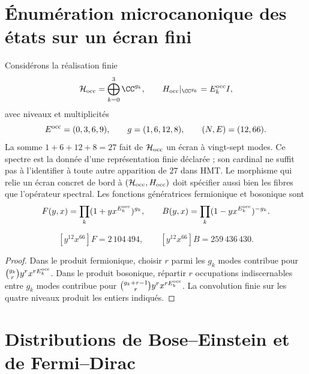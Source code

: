 \section{Énumération microcanonique des états sur un écran fini}
\label{v:rec:ocupacion:section:01}

Considérons la réalisation finie
\[
 \mathcal H_{\rm occ}=\bigoplus_{k=0}^{3}\CC^{g_k},
 \qquad
 H_{\rm occ}|_{\CC^{g_k}}=E_k^{\rm occ} I,
\]
avec niveaux et multiplicités
\[
 E^{\rm occ}=(0,3,6,9),\qquad g=(1,6,12,8),
 \qquad(N,E)=(12,66).
\]
La somme \(1+6+12+8=27\) fait de \(\mathcal H_{\rm occ}\) un écran à
vingt-sept modes. Ce spectre est la donnée d’une représentation finie
déclarée ; son cardinal ne suffit pas à l’identifier à toute autre
apparition de \(27\) dans HMT\@. Le morphisme qui relie un écran concret
de bord à \((\mathcal H_{\rm occ},H_{\rm occ})\) doit spécifier aussi bien
les fibres que l’opérateur spectral.
Les fonctions génératrices fermionique et bosonique sont
\[
 F(y,x)=\prod_k(1+yx^{E_k^{\rm occ}})^{g_k},
 \qquad
 B(y,x)=\prod_k(1-yx^{E_k^{\rm occ}})^{-g_k}.
\]

\begin{proposition}
\label{v:rec:prop:cardinalidades-microcanonicas}
\[
 [y^{12}x^{66}]F=2\,104\,494,
 \qquad
 [y^{12}x^{66}]B=259\,436\,430.
\]
\end{proposition}
\begin{proof}
Dans le produit fermionique, choisir \(r\) parmi les \(g_k\) modes contribue pour
\(\binom{g_k}{r}y^rx^{rE_k^{\rm occ}}\). Dans le produit bosonique, répartir \(r\)
occupations indiscernables entre \(g_k\) modes contribue pour
\(\binom{g_k+r-1}{r}y^rx^{rE_k^{\rm occ}}\). La convolution finie sur les
quatre niveaux produit les entiers indiqués.
\end{proof}

\section{Distributions de Bose--Einstein et de Fermi--Dirac}
\begingroup\fontsize{10}{11.5}\selectfont\setlength{\parskip}{1.5pt}
\setlength{\abovedisplayskip}{3pt}\setlength{\belowdisplayskip}{3pt}
\setlength{\abovedisplayshortskip}{2pt}\setlength{\belowdisplayshortskip}{2pt}
\label{v:rec:ocupacion:section:02}

